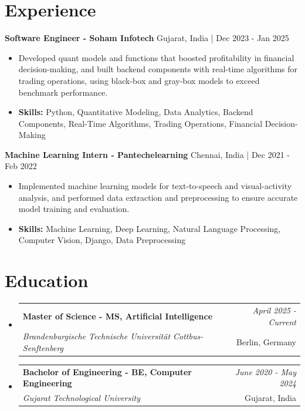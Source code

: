 \documentclass[a4paper,11pt]{article}
\makeatletter
\newcommand{\resumeSubheading}[4]{
\vspace{0.5mm}\item
    \begin{tabular*}{0.98\textwidth}[t]{l@{\extracolsep{\fill}}r}
        \textbf{#1} & \textit{\footnotesize{#4}} \\
        \textit{\footnotesize{#3}} &  \footnotesize{#2}\\
    \end{tabular*}
    \vspace{-2.4mm}
}
\makeatother
\begin{document}
\section{\textbf{Experience}}


\vspace{1mm}
  \textbf{Software Engineer - Soham Infotech} \hfill Gujarat, India | Dec 2023 - Jan 2025
\vspace{-1.5mm} %
\begin{itemize}
  \item Developed quant models and functions that boosted profitability in financial decision-making, and built backend components with real-time algorithms for trading operations, using black-box and gray-box models to exceed benchmark performance.

\vspace{-2mm}
  \item \textbf{Skills:} Python, Quantitative Modeling, Data Analytics, Backend Components, Real-Time Algorithms, Trading Operations, Financial Decision-Making
\end{itemize}

\vspace{1mm}
  \textbf{Machine Learning Intern - Pantechelearning} \hfill Chennai, India | Dec 2021 - Feb 2022
\vspace{-1.5mm} %
\begin{itemize}
  \item Implemented machine learning models for text-to-speech and visual-activity analysis, and performed data extraction and preprocessing to ensure accurate model training and evaluation.
\vspace{-2mm}
  \item \textbf{Skills:} Machine Learning, Deep Learning, Natural Language Processing, Computer Vision, Django, Data Preprocessing
\end{itemize}\section{\textbf{Education}}
\vspace{-0.4mm}

\begin{itemize}
\resumeSubheading
{Master of Science - MS, Artificial Intelligence }{Berlin, Germany}
{Brandenburgische Technische Universität Cottbus-Senftenberg  }{April 2025 - Current}

\vspace{1.0mm} %
\resumeSubheading
{Bachelor of Engineering - BE, Computer Engineering  }{Gujarat, India}
{Gujarat Technological University }{June 2020 - May 2024}

\end{itemize}
\end{document}
